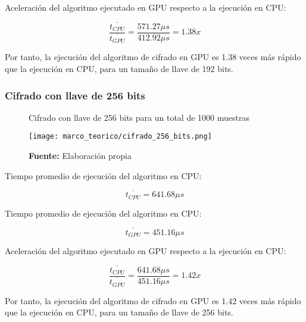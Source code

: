\documentclass[../main/main.tex]{subfiles}
\begin{document}
        Aceleración del algoritmo ejecutado en GPU respecto a la ejecución en CPU:

        \vspace{-0.7cm}\begin{equation}
          \frac{\overline{t_{CPU}}}{\overline{t_{GPU}}} = \frac{571.27\mu s}{412.92\mu s} = 1.38x
        \end{equation}

        Por tanto, la ejecución del algoritmo de cifrado en GPU es 1.38 veces más rápido que la ejecución en CPU, para un tamaño de llave de 192 bits.

      \subsubsection{Cifrado con llave de 256 bits}

        \begin{figure}[H]
          \centering
          \caption{Cifrado con llave de 256 bits para un total de 1000 muestras}
          \texttt{[image: marco\_teorico/cifrado\_256\_bits.png]}
          \caption*{\textbf{Fuente:} Elaboración propia}
        \end{figure}

        Tiempo promedio de ejecución del algoritmo en CPU:

        \vspace{-0.7cm}\begin{equation}
          \overline{t_{CPU}} = 641.68\mu s
        \end{equation}

        Tiempo promedio de ejecución del algoritmo en CPU:

        \vspace{-0.7cm}\begin{equation}
          \overline{t_{GPU}} = 451.16\mu s
        \end{equation}

        Aceleración del algoritmo ejecutado en GPU respecto a la ejecución en CPU:

        \vspace{-0.7cm}\begin{equation}
          \frac{\overline{t_{CPU}}}{\overline{t_{GPU}}} = \frac{641.68\mu s}{451.16\mu s} = 1.42x
        \end{equation}

        Por tanto, la ejecución del algoritmo de cifrado en GPU es 1.42 veces más rápido que la ejecución en CPU, para un tamaño de llave de 256 bits.
\end{document}
